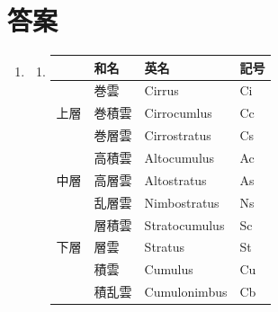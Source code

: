 \documentclass{jsarticle}
\newenvironment{problems}
{
  \renewcommand\labelenumi{\doublebox{\arabic{enumi}}}
  \begin{enumerate}
}{
  \end{enumerate}
  \renewcommand\labelenumi{\arabic{enumi}.}
}
\begin{document}
\section{答案}
\begin{problems}
\item
	\begin{enumerate}[(1)]
  \item 

  \begin{table}[ H]
\begin{tabular}{|l|l|l|l|}
\hline
   & 和名  & 英名            & 記号 \\ \hline
   & 巻雲  & Cirrus        & Ci \\ \cline{2-4} 
上層 & 巻積雲 & Cirrocumlus   & Cc \\ \cline{2-4} 
   & 巻層雲 & Cirrostratus  & Cs \\ \hline
   & 高積雲 & Altocumulus   & Ac \\ \cline{2-4} 
中層 & 高層雲 & Altostratus   & As \\ \cline{2-4} 
   & 乱層雲 & Nimbostratus  & Ns \\ \hline
   & 層積雲 & Stratocumulus & Sc \\ \cline{2-4} 
下層 & 層雲  & Stratus       & St \\ \cline{2-4} 
   & 積雲  & Cumulus       & Cu \\ \cline{2-4} 
   & 積乱雲 & Cumulonimbus  & Cb \\ \hline
\end{tabular}
\end{table}


\end{enumerate}
\end{problems}
\end{document}
